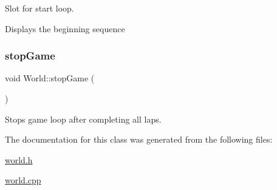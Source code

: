 Slot for start loop. 

Displays the beginning sequence \mbox{\label{class_world_a273f35605dbdafbbd9a819d62b043d95}} 
\subsubsection{\texorpdfstring{stopGame}{stopGame}}
{\footnotesize\ttfamily void World\+::stop\+Game (\begin{DoxyParamCaption}{ }\end{DoxyParamCaption})\hspace{0.3cm}{\ttfamily [slot]}}



Stops game loop after completing all laps. 



The documentation for this class was generated from the following files\+:\begin{DoxyCompactItemize}
\item 
\mbox{\hyperlink{world_8h}{world.\+h}}\item 
\mbox{\hyperlink{world_8cpp}{world.\+cpp}}\end{DoxyCompactItemize}
